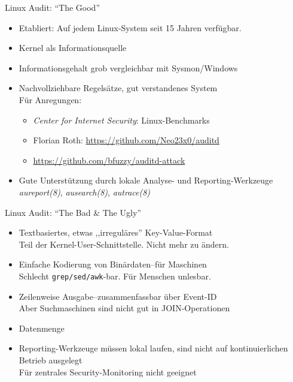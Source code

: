 \documentclass[xcolor={dvipsnames},aspectratio=169]{beamer}
\begin{document}
\begin{frame}{Linux Audit: ``The Good''}
  \begin{itemize}
    \item Etabliert: Auf jedem Linux-System seit 15 Jahren verfügbar.
    \item Kernel als Informationsquelle
    \item Informationsgehalt grob vergleichbar mit Sysmon/Windows
    \item Nachvollziehbare Regelsätze, gut verstandenes System\\
      Für Anregungen:
        \begin{itemize}
        \item \emph{Center for Internet Security}: Linux-Benchmarks
        \item Florian Roth: \url{https://github.com/Neo23x0/auditd}
        \item \url{https://github.com/bfuzzy/auditd-attack}
        \end{itemize}
    \item Gute Unterstützung durch lokale Analyse- und Reporting-Werkzeuge\\
      \emph{aureport(8)}, \emph{ausearch(8)}, \emph{autrace(8)}
  \end{itemize}
\end{frame}
\begin{frame}{Linux Audit: ``The Bad \& The Ugly''}
  \begin{itemize}
  \item Textbasiertes, etwas ,,irreguläres'' Key-Value-Format\\
    {\footnotesize{}Teil der Kernel-User-Schnittstelle. Nicht mehr zu ändern.}
  \item Einfache Kodierung von Binärdaten--für Maschinen\\
    {\footnotesize{}Schlecht \texttt{grep/sed/awk}-bar. Für Menschen unlesbar.}
  \item Zeilenweise Ausgabe--zusammenfassbar über Event-ID\\
    {\footnotesize{}Aber Suchmaschinen sind nicht gut in JOIN-Operationen}
  \item Datenmenge
  \item Reporting-Werkzeuge müssen lokal laufen, sind nicht auf
    kontinuierlichen Betrieb ausgelegt\\
    {\footnotesize{}Für zentrales Security-Monitoring nicht geeignet}
  \end{itemize}
\end{frame}
\end{document}

